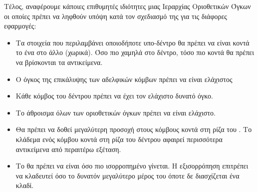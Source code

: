Τέλος, αναφέρουμε κάποιες επιθυμητές ιδιότητες \cite{ericson2004real} 
μιας Ιεραρχίας Οριοθετικών Όγκων οι οποίες πρέπει να ληφθούν υπόψη 
κατά τον σχεδιασμό της για τις διάφορες εφαρμογές:
\begin{itemize}
    \item Τα στοιχεία που περιλαμβάνει οποιοδήποτε υπο-δέντρο 
    θα πρέπει να είναι κοντά το ένα στο άλλο (χωρικά). 
    Όσο πιο χαμηλά στο δέντρο, τόσο πιο κοντά θα πρέπει να 
    βρίσκονται τα αντικείμενα.
    \item Ο όγκος της επικάλυψης των αδελφικών κόμβων πρέπει να είναι ελάχιστος
    \item Κάθε κόμβος του δέντρου πρέπει να έχει τον ελάχιστο δυνατό όγκο.
    \item Το άθροισμα όλων των οριοθετικών όγκων πρέπει να είναι ελάχιστο.
    \item Θα πρέπει να δοθεί μεγαλύτερη προσοχή στους κόμβους κοντά στη 
    ρίζα του . 
    Το κλάδεμα ενός κόμβου κοντά στη ρίζα του δέντρου αφαιρεί περισσότερα αντικείμενα
    από περαιτέρω εξέταση.
    \item Το  θα πρέπει να είναι όσο πιο ισορροπημένο γίνεται. 
    Η εξισορρόπηση επιτρέπει να κλαδευτεί όσο το δυνατόν μεγαλύτερο μέρος 
    του  όποτε δε διασχίζεται ένα κλαδί.
\end{itemize}
